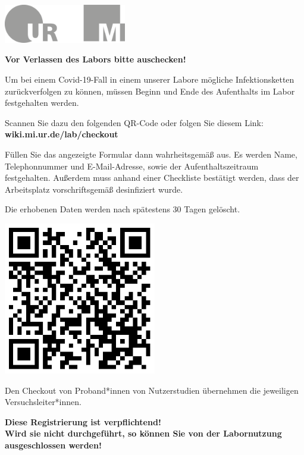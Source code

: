 \documentclass[24pt, a4paper, portrait]{article}
\begin{document}
\pagestyle{empty}

\raggedleft

\includegraphics[width=0.4\textwidth]{logo}

\vspace{1cm}
\sffamily
\centering
\huge

\textbf{Vor Verlassen des Labors bitte auschecken!}

\vspace{1cm}

\raggedright
\Large

Um bei einem Covid-19-Fall in einem unserer Labore mögliche Infektionsketten zurückverfolgen zu können, müssen Beginn und Ende des Aufenthalts im Labor festgehalten werden.

\medskip

Scannen Sie dazu den folgenden QR-Code oder folgen Sie diesem Link: \textbf{wiki.mi.ur.de/lab/checkout}

\medskip

Füllen Sie das angezeigte Formular dann wahrheitsgemäß aus.
Es werden Name, Telephonnummer und E-Mail-Adresse, sowie der Aufenthaltszeitraum festgehalten.
Außerdem muss anhand einer Checkliste bestätigt werden, dass der Arbeitsplatz vorschriftsgemäß desinfiziert wurde.

Die erhobenen Daten werden nach spätestens 30 Tagen gelöscht.

\vspace{1cm}
\centering
\includegraphics[width=0.5\textwidth]{qr/vr4_werkstatt_checkout}

\vspace{1cm}
\raggedright
Den Checkout von Proband*innen von Nutzerstudien übernehmen die jeweiligen Versuchsleiter*innen.

\vspace{5mm}
\centering
\huge
\textbf{Diese Registrierung ist verpflichtend! \\ Wird sie nicht durchgeführt, so können Sie von der Labornutzung ausgeschlossen werden!}
\end{document}
